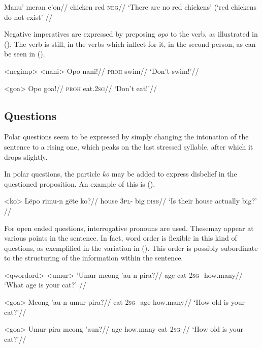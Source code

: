 \documentclass[12pt]{article}
\begin{document}
\begingl %
\gla Manu' meran e'on//
\glb chicken red \textsc{neg}//
\glft `There are no red chickens' (`red chickens do not exist' // 
\endgl
\xe

Negative imperatives are expressed by preposing \textit{opo} to the verb, as illustrated in (). The verb is still, in the verbs which inflect for it, in the second person, as can be seen in ().

\pex<negimp> %
\a<nani> %
\begingl %
\gla Opo nani!//
\glb \textsc{proh} swim//
\glft `Don't swim!'//
\endgl

\a<goa> %
\begingl %
\gla Opo goa!//
\glb \textsc{proh} eat.\textsc{2sg}//
\glft `Don't eat!'// 
\endgl
\xe

\subsection{Questions}

Polar questions seem to be expressed by simply changing the intonation of the sentence to a rising one, which peaks on the last stressed syllable, after which it drops slightly.

In polar questions, the particle \textit{ko} may be added to express disbelief in the questioned proposition. An example of this is ().

\ex<ko>
\begingl %
\gla Lëpo rimu-n gëte ko?//
\glb house 3\textsc{pl}-\Poss{} big \textsc{disb}//
\glft `Is their house actually big?' // 
\endgl 
\xe

For open ended questions, interrogative pronouns are used. Thesemay appear at various points in the sentence. In fact, word order is flexible in this kind of questions, as exemplified in the variation in (). This order is possibly subordinate to the structuring of the information within the sentence.

\pex<qwordord> %
\a<umur>
\begingl %
\gla 'Umur meong 'au-n pira?//
\glb age cat \textsc{2sg}-\Poss{} how.many//
\glft `What age is your cat?' // 
\endgl 

\a<goa> %
\begingl %
\gla Meong 'au-n umur pira?//
\glb cat \textsc{2sg}-\Poss{} age how.many//
\glft `How old is your cat?'// 
\endgl

\a<goa> %
\begingl %
\gla Umur pira meong 'aun?//
\glb age how.many cat \textsc{2sg}-\Poss{}//
\glft `How old is your cat?'// 
\endgl
\xe
\end{document}
